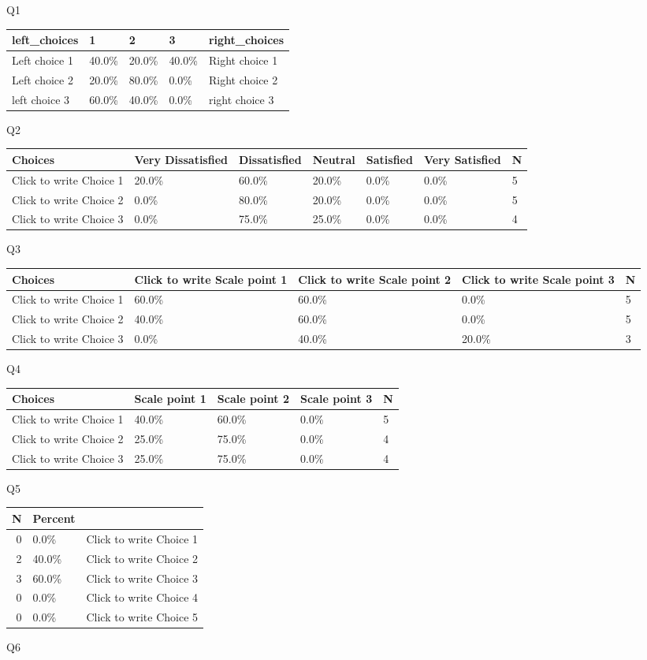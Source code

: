 \documentclass{article}\usepackage[]{graphicx}\usepackage[]{color}
\begin{document}
Q1

\begin{tabular}{l|l|l|l|l}
\hline
left\_choices & 1 & 2 & 3 & right\_choices\\
\hline
Left choice 1 & 40.0\% & 20.0\% & 40.0\% & Right choice 1\\
\hline
Left choice 2 & 20.0\% & 80.0\% & 0.0\% & Right choice 2\\
\hline
left choice 3 & 60.0\% & 40.0\% & 0.0\% & right choice 3\\
\hline
\end{tabular}
Q2

\begin{tabular}{l|l|l|l|l|l|l}
\hline
Choices & Very Dissatisfied & Dissatisfied  & Neutral & Satisfied & Very Satisfied & N\\
\hline
Click to write Choice 1 & 20.0\% & 60.0\% & 20.0\% & 0.0\% & 0.0\% & 5\\
\hline
Click to write Choice 2 & 0.0\% & 80.0\% & 20.0\% & 0.0\% & 0.0\% & 5\\
\hline
Click to write Choice 3 & 0.0\% & 75.0\% & 25.0\% & 0.0\% & 0.0\% & 4\\
\hline
\end{tabular}
Q3

\begin{tabular}{l|l|l|l|l}
\hline
Choices & Click to write Scale point 1 & Click to write Scale point 2 & Click to write Scale point 3 & N\\
\hline
Click to write Choice 1 & 60.0\% & 60.0\% & 0.0\% & 5\\
\hline
Click to write Choice 2 & 40.0\% & 60.0\% & 0.0\% & 5\\
\hline
Click to write Choice 3 & 0.0\% & 40.0\% & 20.0\% & 3\\
\hline
\end{tabular}
Q4

\begin{tabular}{l|l|l|l|l}
\hline
Choices & Scale point 1 & Scale point 2 & Scale point 3 & N\\
\hline
Click to write Choice 1 & 40.0\% & 60.0\% & 0.0\% & 5\\
\hline
Click to write Choice 2 & 25.0\% & 75.0\% & 0.0\% & 4\\
\hline
Click to write Choice 3 & 25.0\% & 75.0\% & 0.0\% & 4\\
\hline
\end{tabular}
Q5

\begin{tabular}{r|l|l}
\hline
N & Percent & \\
\hline
0 & 0.0\% & Click to write Choice 1\\
\hline
2 & 40.0\% & Click to write Choice 2\\
\hline
3 & 60.0\% & Click to write Choice 3\\
\hline
0 & 0.0\% & Click to write Choice 4\\
\hline
0 & 0.0\% & Click to write Choice 5\\
\hline
\end{tabular}
Q6
\end{document}
